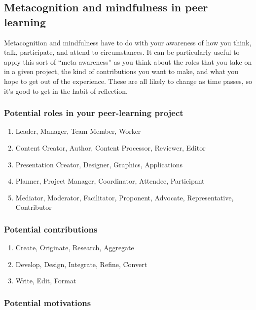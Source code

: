 \subsection{Metacognition and mindfulness in peer learning}

Metacognition and mindfulness have to do with your awareness of how you
think, talk, participate, and attend to circumstances. It can be
particularly useful to apply this sort of ``meta awareness'' as you
think about the roles that you take on in a given project, the kind of
contributions you want to make, and what you hope to get out of the
experience. These are all likely to change as time passes, so it's good
to get in the habit of reflection.

\subsubsection{Potential roles in your peer-learning project}

\begin{enumerate}
\item
  Leader, Manager, Team Member, Worker
\item
  Content Creator, Author, Content Processor, Reviewer, Editor
\item
  Presentation Creator, Designer, Graphics, Applications
\item
  Planner, Project Manager, Coordinator, Attendee, Participant
\item
  Mediator, Moderator, Facilitator, Proponent, Advocate, Representative,
  Contributor
\end{enumerate}
\subsubsection{Potential contributions}

\begin{enumerate}
\item
  Create, Originate, Research, Aggregate
\item
  Develop, Design, Integrate, Refine, Convert
\item
  Write, Edit, Format
\end{enumerate}
\subsubsection{Potential motivations}

